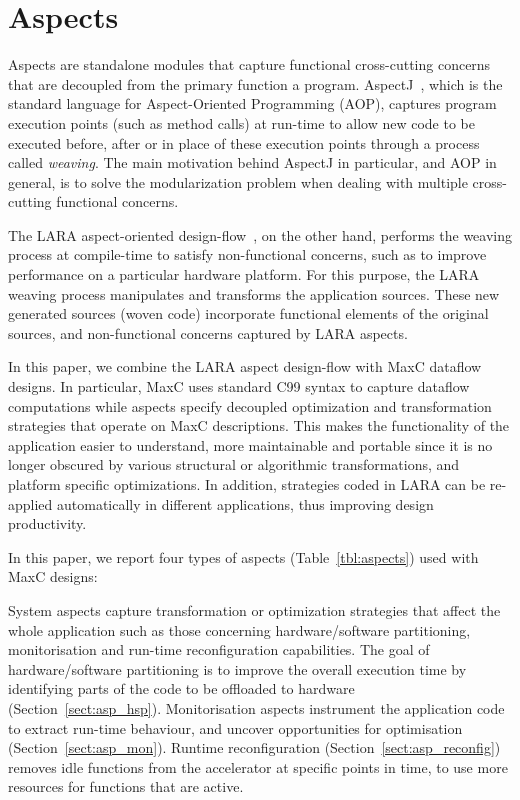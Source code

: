 \section{Aspects}
\label{sec:aspects}

Aspects are standalone modules that capture functional cross-cutting concerns
that are decoupled from the primary function a program. AspectJ~\cite{Kiczales:2001}, which is the standard language for Aspect-Oriented Programming (AOP),  captures program execution points (such as method calls) at run-time to allow new code to be executed before, after or in place of these execution points through a process called \emph{weaving}. The main motivation behind AspectJ in particular, and AOP in general, is to solve the modularization problem when dealing with multiple cross-cutting functional concerns.

The LARA aspect-oriented design-flow~\cite{Cardoso:Carvalho:Cutinho:Luk:Nobre:Diniz:Petrov:2012}, on the other hand, performs the weaving process at compile-time to satisfy non-functional concerns, such as to improve performance on a particular hardware platform. For this purpose, the LARA weaving process manipulates and transforms the application sources. These new generated sources (woven code) incorporate functional elements of the original sources, and non-functional concerns captured by LARA aspects.

In this paper, we combine the LARA aspect design-flow with MaxC dataflow designs. In particular, MaxC uses standard C99 syntax to capture dataflow computations while aspects specify decoupled optimization and transformation strategies that operate on MaxC descriptions. This makes the
functionality of the application easier to understand, more
maintainable and portable since it is no longer obscured by various
structural or algorithmic transformations, and platform specific
optimizations. In addition, strategies coded in LARA can be re-applied automatically in different applications, thus improving design productivity.

In this paper, we report four types of aspects (Table~\ref{tbl:aspects}) used with MaxC designs:

\vspace*{0.5ex}
 System aspects capture transformation or optimization strategies that affect the whole application such as those concerning
hardware/software partitioning, monitorisation and run-time reconfiguration
capabilities. The goal of hardware/software partitioning is to improve the overall
execution time by identifying parts of the code to be offloaded to hardware (Section~\ref{sect:asp_hsp}). Monitorisation aspects instrument the application code to extract run-time behaviour, and uncover opportunities for optimisation (Section~\ref{sect:asp_mon}). Runtime reconfiguration (Section~\ref{sect:asp_reconfig}) removes idle functions from the accelerator at specific points in time, to use more resources for functions that are active.

